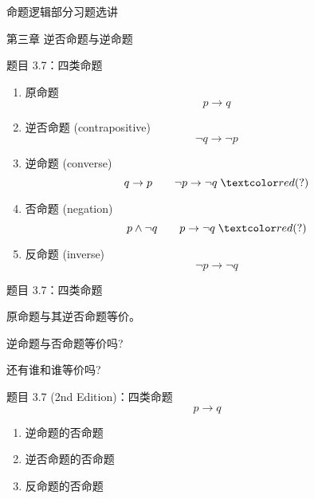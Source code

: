 \begin{frame}{}
  \centerline{\LARGE 命题逻辑部分习题选讲}
  \vspace{0.50cm}
  \centerline{\large 第三章 \; 逆否命题与逆命题}
\end{frame}

\begin{frame}{}
  \begin{exampleblock}{题目 3.7：四类命题}
    \begin{enumerate}
      \item 原命题
	\[
	  p \to q
	\]
      \item 逆否命题 (contrapositive)
	\[
	  \lnot q \to \lnot p
	\]
      \item 逆命题 (converse)
	\[
	  q \to p \qquad \lnot p \to \lnot q \; \red{(?)}
	\]
      \item 否命题 (negation)
	\[
	  p \land \lnot q \qquad p \to \lnot q \; \red{(?)}
	\]
      \pause
      \item 反命题 (inverse)
	\[
	  \lnot p \to \lnot q
	\]
    \end{enumerate}
  \end{exampleblock}
\end{frame}

\begin{frame}{}
  \begin{exampleblock}{题目 3.7：四类命题}
    \centerline{原命题与其逆否命题等价。}

    \vspace{0.50cm}
    \centerline{逆命题与否命题等价吗?}

    \vspace{0.50cm}
    \centerline{还有谁和谁等价吗?}
  \end{exampleblock}
\end{frame}

\begin{frame}{}
  \begin{exampleblock}{题目 3.7 (2nd Edition)：四类命题}
    \[
      p \to q
    \]
    \begin{enumerate}
      \item 逆命题的否命题
      \item 逆否命题的否命题
      \item 反命题的否命题
    \end{enumerate}
  \end{exampleblock}
\end{frame}

